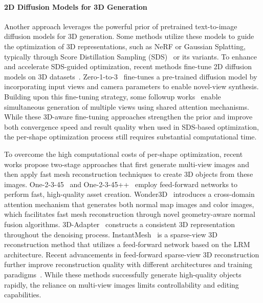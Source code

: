 \vspace{-14pt}
\paragraph{2D Diffusion Models for 3D Generation}
Another approach leverages the powerful prior of pretrained text-to-image diffusion models \cite{rombach2022highresolutionimagesynthesislatent} for 3D generation. Some methods \cite{wang2022scorejacobianchaininglifting, poole2022dreamfusion,metzer2022latent, katzir2024noisefree, chen2023fantasia3d, wang2023prolificdreamer, lin2023magic3dhighresolutiontextto3dcontent, yi2024gaussiandreamerfastgenerationtext,tang2024dreamgaussiangenerativegaussiansplatting} utilize these models to guide the optimization of 3D representations, such as NeRF or Gaussian Splatting, typically through Score Distillation Sampling (SDS)~\cite{poole2022dreamfusion} or its variants.
To enhance and accelerate SDS-guided optimization, recent methods fine-tune 2D diffusion models on 3D datasets~\cite{deitke2023objaversexluniverse10m3d}. Zero-1-to-3~\cite{liu2023zero1to3} fine-tunes a pre-trained diffusion model by incorporating input views and camera parameters to enable novel-view synthesis. Building upon this fine-tuning strategy, some followup works~\cite{shi2024mvdream, liu2024syncdreamergeneratingmultiviewconsistentimages,Szymanowicz_2023_ICCV,shi2023zero123singleimageconsistent} enable simultaneous generation of multiple views using shared attention mechanisms. While these 3D-aware fine-tuning approaches strengthen the prior and improve both convergence speed and result quality when used in SDS-based optimization, the per-shape optimization process still requires substantial computational time.

To overcome the high computational costs of per-shape optimization, recent works propose two-stage approaches that first generate multi-view images and then apply fast mesh reconstruction techniques to create 3D objects from these images. One-2-3-45~\cite{liu2023one2345} and One-2-3-45++~\cite{liu2023one2345++} employ feed-forward networks to perform fast, high-quality asset creation. Wonder3D~\cite{long2023wonder3dsingleimage3d} introduces a cross-domain attention mechanism that generates both normal map images and color images, which facilitates fast mesh reconstruction through novel geometry-aware normal fusion algorithms.
%
3D-Adapter~\cite{3dadapter2024} constructs a consistent 3D representation throughout the denoising process.
%
InstantMesh~\cite{xu2024instantmesh} is a sparse-view 3D reconstruction method that utilizes a feed-forward network based on the LRM~\cite{hong2024lrmlargereconstructionmodel} architecture. Recent advancements in feed-forward sparse-view 3D reconstruction further improve reconstruction quality with different architectures and training paradigms~\cite{zhuang2024gtr, jin2024lvsmlargeviewsynthesis}. While these methods successfully generate high-quality objects rapidly, the reliance on multi-view images limits controllability and editing capabilities.
 

